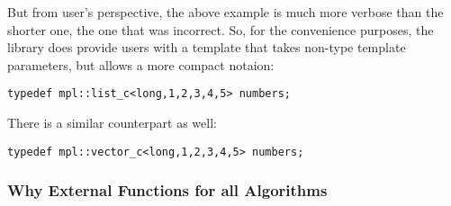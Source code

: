 \documentclass{netobjectdays}
\begin{document}
But from user's perspective, the above example is much more
verbose than the shorter one, the one that was incorrect. So, 
for the convenience purposes, the library does provide users 
with a template that takes non-type template parameters, but 
allows a more compact notaion:

{\footnotesize
\begin{verbatim}
typedef mpl::list_c<long,1,2,3,4,5> numbers;
\end{verbatim}
}

There is a similar  counterpart as well:

{\footnotesize
\begin{verbatim}
typedef mpl::vector_c<long,1,2,3,4,5> numbers;
\end{verbatim}
}


\subsubsection{Why External Functions for all Algorithms}
\end{document}

